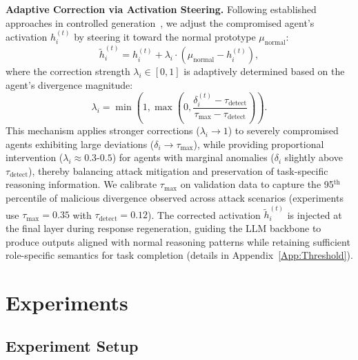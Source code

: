 \documentclass{article}
\theoremstyle{plain}
\theoremstyle{definition}
\theoremstyle{remark}
\begin{document}
\noindent\textbf{Adaptive Correction via Activation Steering.}
Following established approaches in controlled 
generation~\cite{zhang2025controlling}, we adjust the compromised 
agent's activation $h_i^{(t)}$ by steering it toward the normal 
prototype $\mu_{\text{normal}}$:
\begin{equation}
\tilde{h}_i^{(t)} = h_i^{(t)} + \lambda_i \cdot (\mu_{\text{normal}} - h_i^{(t)}),
\label{eq:correction}
\end{equation}
where the correction strength $\lambda_i \in [0,1]$ is adaptively 
determined based on the agent's divergence magnitude:
\begin{equation}
\lambda_i = \min\!\left(1, \max\!\left(0, 
\frac{\delta_i^{(t)} - \tau_{\text{detect}}}{\tau_{\text{max}} - \tau_{\text{detect}}}
\right)\right).
\label{eq:adaptive_lambda}
\end{equation}
This mechanism applies stronger corrections ($\lambda_i \rightarrow 1$) 
to severely compromised agents exhibiting large deviations 
($\delta_i \rightarrow \tau_{\text{max}}$), while providing proportional 
intervention ($\lambda_i \approx 0.3$-$0.5$) for agents with marginal 
anomalies ($\delta_i$ slightly above $\tau_{\text{detect}}$), thereby 
balancing attack mitigation and preservation of task-specific reasoning 
information. We calibrate $\tau_{\text{max}}$ on validation data to 
capture the 95$^{\text{th}}$ percentile of malicious divergence observed across 
attack scenarios (experiments use $\tau_{\text{max}} = 0.35$ with 
$\tau_{\text{detect}} = 0.12$). The corrected activation $\tilde{h}_i^{(t)}$ 
is injected at the final layer during response regeneration, 
guiding the LLM backbone to produce outputs aligned with normal reasoning 
patterns while retaining sufficient role-specific semantics for task completion  (details in Appendix~\ref{App:Threshold}).




\section{Experiments}

\subsection{Experiment Setup}
\end{document}
